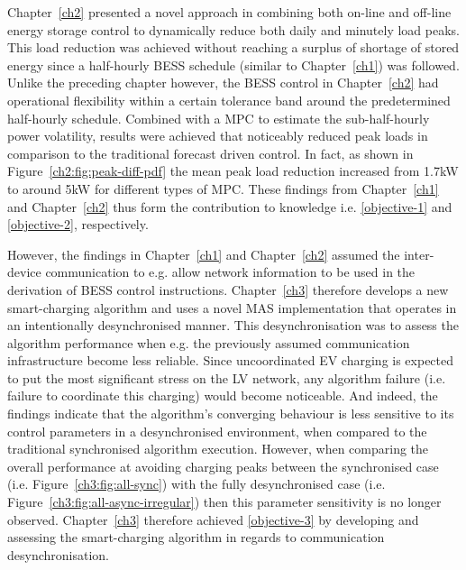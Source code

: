 Chapter~\ref{ch2} presented a novel approach in combining both on-line and off-line energy storage control to dynamically reduce both daily and minutely load peaks.
This load reduction was achieved without reaching a surplus of shortage of stored energy since a half-hourly BESS schedule (similar to Chapter~\ref{ch1}) was followed.
Unlike the preceding chapter however, the BESS control in Chapter~\ref{ch2} had operational flexibility within a certain tolerance band around the predetermined half-hourly schedule.
Combined with a MPC to estimate the sub-half-hourly power volatility, results were achieved that noticeably reduced peak loads in comparison to the traditional forecast driven control.
In fact, as shown in Figure~\ref{ch2:fig:peak-diff-pdf} the mean peak load reduction increased from 1.7kW to around 5kW for different types of MPC.
These findings from Chapter~\ref{ch1} and Chapter~\ref{ch2} thus form the contribution to knowledge i.e. \ref{objective-1} and \ref{objective-2}, respectively.

However, the findings in Chapter~\ref{ch1} and Chapter~\ref{ch2} assumed the inter-device communication to e.g. allow network information to be used in the derivation of BESS control instructions.
Chapter~\ref{ch3} therefore develops a new smart-charging algorithm and uses a novel MAS implementation that operates in an intentionally desynchronised manner.
This desynchronisation was to assess the algorithm performance when e.g. the previously assumed communication infrastructure become less reliable.
Since uncoordinated EV charging is expected to put the most significant stress on the LV network, any algorithm failure (i.e. failure to coordinate this charging) would become noticeable.
And indeed, the findings indicate that the algorithm's converging behaviour is less sensitive to its control parameters in a desynchronised environment, when compared to the traditional synchronised algorithm execution.
However, when comparing the overall performance at avoiding charging peaks between the synchronised case (i.e. Figure~\ref{ch3:fig:all-sync}) with the fully desynchronised case (i.e. Figure~\ref{ch3:fig:all-async-irregular}) then this parameter sensitivity is no longer observed.
Chapter~\ref{ch3} therefore achieved \ref{objective-3} by developing and assessing the smart-charging algorithm in regards to communication desynchronisation.

